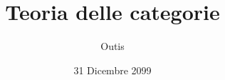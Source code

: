 \documentclass[ paper=a4
              , pagesize
              , fontsize=12pt
              , twoside=true
              , bibliography=totoc
              , version=last
              ]{scrbook}
\begin{document}
\frontmatter

\title{Teoria delle categorie}
\author{Outis}
\date{31 Dicembre 2099}
\publishers{Casa editrice}
\uppertitleback{Dettagli pubblicazione I?}
\lowertitleback{Dettagli pubblicazione II?}
\dedication{Alla 1,3,7-trimetilxantina ---senza cui la matematica non esisterebbe}

\maketitle

\tableofcontents

\mainmatter











\appendix



\clearpage

\backmatter
\printindex


\end{document}
